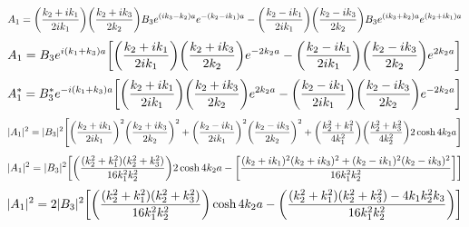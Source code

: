 \documentclass[12pt]{article}
\begin{document}
\[A_1=\qty(\frac{k_2+ik_1}{2ik_1})\qty(\frac{k_2+ik_3}{2k_2})B_3e^{(ik_3-k_2)a}e^{-(k_2-ik_1)a}-\qty(\frac{k_2-ik_1}{2ik_1})\qty(\frac{k_2-ik_3}{2k_2})B_3e^{(ik_3+k_2)a}e^{(k_2+ik_1)a}\]
\[A_1=B_3e^{i(k_1+k_3)a}\qty[\qty(\frac{k_2+ik_1}{2ik_1})\qty(\frac{k_2+ik_3}{2k_2})e^{-2k_2a}-\qty(\frac{k_2-ik_1}{2ik_1})\qty(\frac{k_2-ik_3}{2k_2})e^{2k_2a}]\]
\[A_1^*=B_3^*e^{-i(k_1+k_3)a}\qty[\qty(\frac{k_2+ik_1}{2ik_1})\qty(\frac{k_2+ik_3}{2k_2})e^{2k_2a}-\qty(\frac{k_2-ik_1}{2ik_1})\qty(\frac{k_2-ik_3}{2k_2})e^{-2k_2a}]\]
\[|A_1|^2=|B_3|^2\qty[\qty(\frac{k_2+ik_1}{2ik_1})^2\qty(\frac{k_2+ik_3}{2k_2})^2+\qty(\frac{k_2-ik_1}{2ik_1})^2\qty(\frac{k_2-ik_3}{2k_2})^2+\qty(\frac{k_2^2+k_1^2}{4k_1^2})\qty(\frac{k_2^2+k_3^2}{4k_2^2})2\cosh{4k_2a}]\]
\[|A_1|^2=|B_3|^2\qty[\qty(\frac{(k_2^2+k_1^2)(k_2^2+k_3^2)}{16k_1^2k_2^2})2\cosh{4k_2a}-\qty[\frac{(k_2+ik_1)^2(k_2+ik_3)^2+(k_2-ik_1)^2(k_2-ik_3)^2}{16k_1^2k_2^2}]]\]
\[|A_1|^2=2|B_3|^2\qty[\qty(\frac{(k_2^2+k_1^2)(k_2^2+k_3^2)}{16k_1^2k_2^2})\cosh{4k_2a}-\qty(\frac{(k_2^2+k_1^2)(k_2^2+k_3^2)-4k_1k_2^2k_3}{16k_1^2k_2^2})]\]
\end{document}
